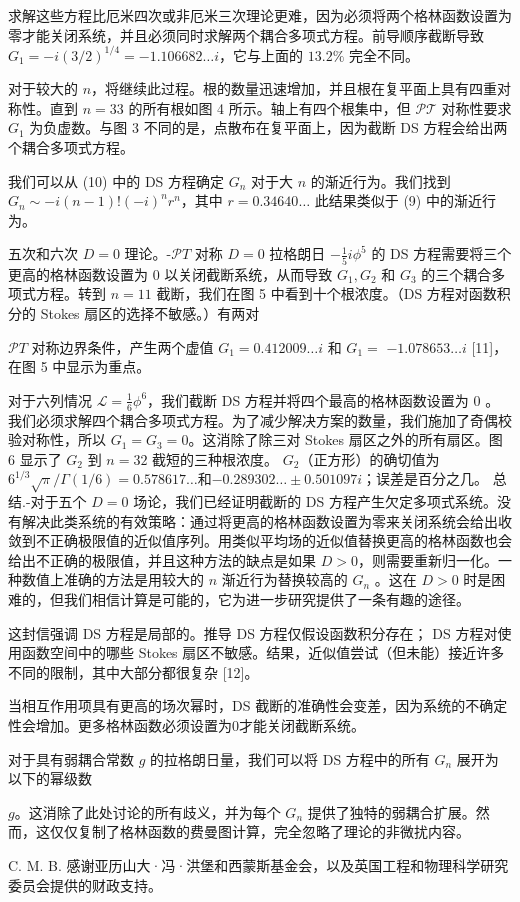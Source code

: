 \documentclass[UTF8]{ctexart}
\begin{document}
求解这些方程比厄米四次或非厄米三次理论更难，因为必须将两个格林函数设置为零才能关闭系统，并且必须同时求解两个耦合多项式方程。前导顺序截断导致 \( G_{1}=-i(3 / 2)^{1 / 4}=-1.106682 \ldots i \)，它与上面的 \( 13.2 \% \) 完全不同。

对于较大的 \( n \)，将继续此过程。根的数量迅速增加，并且根在复平面上具有四重对称性。直到 \( n=33 \) 的所有根如图 4 所示。轴上有四个根集中，但 \( \mathcal{P T} \) 对称性要求 \( G_{1} \) 为负虚数。与图 3 不同的是，点散布在复平面上，因为截断 DS 方程会给出两个耦合多项式方程。

我们可以从 (10) 中的 DS 方程确定 \( G_{n} \) 对于大 \( n \) 的渐近行为。我们找到 \( G_{n} \sim-i(n-1) !(-i)^{n} r^{n} \)，其中 \( r=0.34640 \ldots \) 此结果类似于 (9) 中的渐近行为。


五次和六次 \( D=0 \) 理论。-\( \mathcal{P} T \) 对称 \( D=0 \) 拉格朗日 \( -\frac{1}{5} i \phi^{5} \) 的 DS 方程需要将三个更高的格林函数设置为 0 以关闭截断系统，从而导致 \( G_{1}, G_{2} \) 和 \( G_{3} \) 的三个耦合多项式方程。转到 \( n=11 \) 截断，我们在图 5 中看到十个根浓度。（DS 方程对函数积分的 Stokes 扇区的选择不敏感。）有两对


\( \mathcal{P} T \) 对称边界条件，产生两个虚值 \( G_{1}=0.412009 \ldots i \) 和 \( G_{1}= \) \( -1.078653 \ldots i \) [11]，在图 5 中显示为重点。

对于六列情况 \( \mathcal{L}=\frac{1}{6} \phi^{6} \)，我们截断 DS 方程并将四个最高的格林函数设置为 0 。我们必须求解四个耦合多项式方程。为了减少解决方案的数量，我们施加了奇偶校验对称性，所以 \( G_{1}=G_{3}=0 \)。这消除了除三对 Stokes 扇区之外的所有扇区。图 6 显示了 \( G_{2} \) 到 \( n=32 \) 截短的三种根浓度。 \( G_{2} \)（正方形）的确切值为\( 6^{1 / 3} \sqrt{\pi} / \Gamma(1 / 6)=0.578617 \ldots \)和\( -0.289302 \ldots \pm 0.501097 i \)；误差是百分之几。
总结.-对于五个 \( D=0 \) 场论，我们已经证明截断的 DS 方程产生欠定多项式系统。没有解决此类系统的有效策略：通过将更高的格林函数设置为零来关闭系统会给出收敛到不正确极限值的近似值序列。用类似平均场的近似值替换更高的格林函数也会给出不正确的极限值，并且这种方法的缺点是如果 \( D>0 \)，则需要重新归一化。一种数值上准确的方法是用较大的 \( n \) 渐近行为替换较高的 \( G_{n} \) 。这在 \( D>0 \) 时是困难的，但我们相信计算是可能的，它为进一步研究提供了一条有趣的途径。

这封信强调 DS 方程是局部的。推导 DS 方程仅假设函数积分存在； DS 方程对使用函数空间中的哪些 Stokes 扇区不敏感。结果，近似值尝试（但未能）接近许多不同的限制，其中大部分都很复杂 [12]。

当相互作用项具有更高的场次幂时，DS 截断的准确性会变差，因为系统的不确定性会增加。更多格林函数必须设置为0才能关闭截断系统。


对于具有弱耦合常数 \( g \) 的拉格朗日量，我们可以将 DS 方程中的所有 \( G_{n} \) 展开为以下的幂级数


\( g \)。这消除了此处讨论的所有歧义，并为每个 \( G_{n} \) 提供了独特的弱耦合扩展。然而，这仅仅复制了格林函数的费曼图计算，完全忽略了理论的非微扰内容。

C. M. B. 感谢亚历山大·冯·洪堡和西蒙斯基金会，以及英国工程和物理科学研究委员会提供的财政支持。
\end{document}
